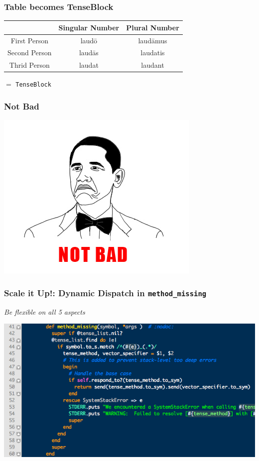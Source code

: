\documentclass[slidestop,compress,mathserif]{beamer}
\begin{document}
\begin{frame}
	\frametitle{Table becomes TenseBlock}
	\begin{center}
		\begin{tabular}{|c|c|c|}
			\hline
			  & Singular Number &  Plural Number\\
			\hline
			First Person  & laud\={o}  & laud\={a}mus\\
			Second Person & laud\={a}s & laudatis \\
			Thrid Person  & laudat     & laudant \\
			\hline
		\end{tabular}
		\vskip 0.5cm
		$=$
		\vskip 0.5cm
		\texttt{TenseBlock}
	\end{center}
\end{frame}

\begin{frame}
	\frametitle{Not Bad}
	\includegraphics[scale=0.75]{img/not_bad.png}
\end{frame}

\begin{frame}
	\frametitle{Scale it Up!: Dynamic Dispatch in \texttt{method\_missing}}
	\begin{center}
		\emph{Be flexible on all 5 aspects}
	\end{center}
	\includegraphics[scale=0.45]{img/lv_mm.png}
\end{frame}
\end{document}
